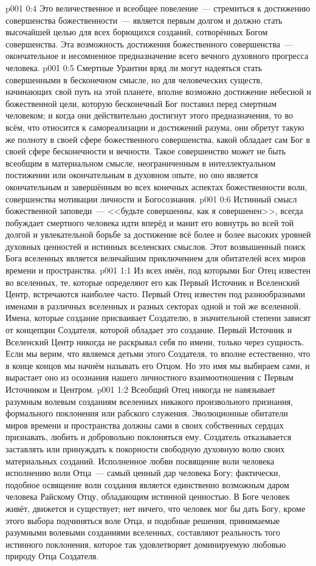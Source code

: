 \vs p001 0:4 Это величественное и всеобщее повеление~--- стремиться к достижению совершенства божественности~--- является первым долгом и должно стать высочайшей целью для всех борющихся созданий, сотворённых Богом совершенства. Эта возможность достижения божественного совершенства~--- окончательное и несомненное предназначение всего вечного духовного прогресса человека.
\vs p001 0:5 Смертные Урантии вряд ли могут надеяться стать совершенными в бесконечном смысле, но для человеческих существ, начинающих свой путь на этой планете, вполне возможно достижение небесной и божественной цели, которую бесконечный Бог поставил перед смертным человеком; и когда они действительно достигнут этого предназначения, то во всём, что относится к самореализации и достижений разума, они обретут такую же полноту в своей сфере божественного совершенства, какой обладает сам Бог в своей сфере бесконечности и вечности. Такое совершенство может не быть всеобщим в материальном смысле, неограниченным в интеллектуальном постижении или окончательным в духовном опыте, но оно является окончательным и завершённым во всех конечных аспектах божественности воли, совершенства мотивации личности и Богосознания.
\vs p001 0:6 Истинный смысл божественной заповеди~--- <<будьте совершенны, как я совершенен>>, всегда побуждает смертного человека идти вперёд и манит его вовнутрь во всей той долгой и увлекательной борьбе за достижение всё более и более высоких уровней духовных ценностей и истинных вселенских смыслов. Этот возвышенный поиск Бога вселенных является величайшим приключением для обитателей всех миров времени и пространства.
\vs p001 1:1 Из всех имён, под которыми Бог Отец известен во вселенных, те, которые определяют его как Первый Источник и Вселенский Центр, встречаются наиболее часто. Первый Отец известен под разнообразными именами в различных вселенных и разных секторах одной и той же вселенной. Имена, которые создание присваивает Создателю, в значительной степени зависят от концепции Создателя, которой обладает это создание. Первый Источник и Вселенский Центр никогда не раскрывал себя по имени, только через сущность. Если мы верим, что являемся детьми этого Создателя, то вполне естественно, что в конце концов мы начнём называть его Отцом. Но это имя мы выбираем сами, и вырастает оно из осознания нашего личностного взаимоотношения с Первым Источником и Центром.
\vs p001 1:2 Всеобщий Отец никогда не навязывает разумным волевым созданиям вселенных никакого произвольного признания, формального поклонения или рабского служения. Эволюционные обитатели миров времени и пространства должны сами в своих собственных сердцах признавать, любить и добровольно поклоняться ему. Создатель отказывается заставлять или принуждать к покорности свободную духовную волю своих материальных созданий. Исполненное любви посвящение воли человека исполнению воли Отца~--- самый ценный дар человека Богу; фактически, подобное освящение воли создания является единственно возможным даром человека Райскому Отцу, обладающим истинной ценностью. В Боге человек живёт, движется и существует; нет ничего, что человек мог бы дать Богу, кроме этого выбора подчиняться воле Отца, и подобные решения, принимаемые разумными волевыми созданиями вселенных, составляют реальность того истинного поклонения, которое так удовлетворяет доминируемую любовью природу Отца Создателя.

